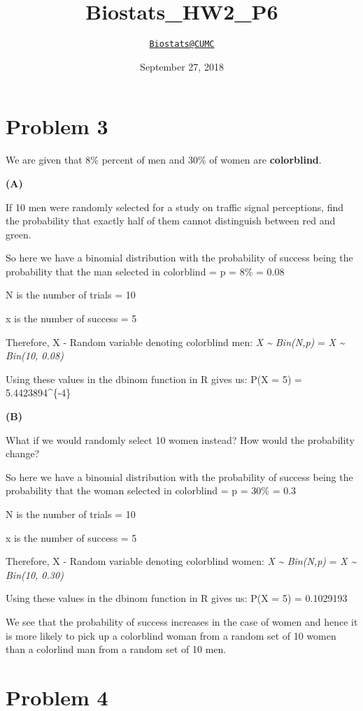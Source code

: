 \documentclass[]{article}
\title{Biostats\_HW2\_P6}
\author{\href{mailto:Biostats@CUMC}{\nolinkurl{Biostats@CUMC}}}
\date{September 27, 2018}
\begin{document}
\maketitle

\section{Problem 3}\label{problem-3}

We are given that 8\% percent of men and 30\% of women are
\textbf{colorblind}.

\textbf{(A)}

If 10 men were randomly selected for a study on traffic signal
perceptions, find the probability that exactly half of them cannot
distinguish between red and green.

So here we have a binomial distribution with the probability of success
being the probability that the man selected in colorblind = p = 8\% =
0.08

N is the number of trials = 10

x is the number of success = 5

Therefore, X - Random variable denoting colorblind men: \emph{X
\textasciitilde{} Bin(N,p)} = \emph{X \textasciitilde{} Bin(10, 0.08)}

Using these values in the dbinom function in R gives us: P(X = 5) =
5.4423894\^{}\{-4\}

\textbf{(B)}

What if we would randomly select 10 women instead? How would the
probability change?

So here we have a binomial distribution with the probability of success
being the probability that the woman selected in colorblind = p = 30\% =
0.3

N is the number of trials = 10

x is the number of success = 5

Therefore, X - Random variable denoting colorblind women: \emph{X
\textasciitilde{} Bin(N,p)} = \emph{X \textasciitilde{} Bin(10, 0.30)}

Using these values in the dbinom function in R gives us: P(X = 5) =
0.1029193

We see that the probability of success increases in the case of women
and hence it is more likely to pick up a colorblind woman from a random
set of 10 women than a colorlind man from a random set of 10 men.

\section{Problem 4}\label{problem-4}
\end{document}
